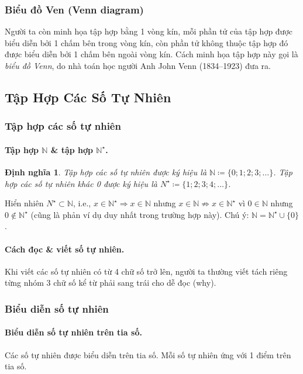 \documentclass{article}
\numberwithin{equation}{section}
\newtheorem{definition}{Định nghĩa}[section]
\begin{document}
\subsubsection{Biểu đồ Ven (Venn diagram)}
Người ta còn minh họa tập hợp bằng 1 vòng kín, mỗi phần tử của tập hợp được biểu diễn bởi 1 chấm bên trong vòng kín, còn phần tử không thuộc tập hợp đó được biểu diễn bởi 1 chấm bên ngoài vòng kín. Cách minh họa tập hợp này gọi là \textit{biểu đồ Venn}, do nhà toán học người Anh John Venn (1834--1923) đưa ra.

\subsection{Tập Hợp Các Số Tự Nhiên}

\subsubsection{Tập hợp các số tự nhiên}

\paragraph{Tập hợp $\mathbb{N}$ \& tập hợp $\mathbb{N}^\star$.}
\begin{definition}
	\emph{Tập hợp các số tự nhiên} được ký hiệu là $\mathbb{N}\coloneqq\{0;1;2;3;\ldots\}$. \emph{Tập hợp các số tự nhiên khác 0} được ký hiệu là $N^\star\coloneqq\{1;2;3;4;\ldots\}$.
\end{definition}
Hiển nhiên $N^\star\subset\mathbb{N}$, i.e., $x\in\mathbb{N}^\star\Rightarrow x\in\mathbb{N}$ nhưng $x\in\mathbb{N}\not\Rightarrow x\in\mathbb{N}^\star$ vì $0\in\mathbb{N}$ nhưng $0\notin\mathbb{N}^\star$ (cũng là phản ví dụ duy nhất trong trường hợp này). Chú ý: $\mathbb{N} = \mathbb{N}^\star\cup\{0\}$.

\paragraph{Cách đọc \& viết số tự nhiên.} Khi viết các số tự nhiên có từ 4 chữ số trở lên, người ta thường viết tách riêng từng nhóm 3 chữ số kể từ phải sang trái cho dễ đọc (why).

\subsubsection{Biểu diễn số tự nhiên}

\paragraph{Biểu diễn số tự nhiên trên tia số.} Các số tự nhiên được biểu diễn trên tia số. Mỗi số tự nhiên ứng với 1 điểm trên tia số.
\end{document}
